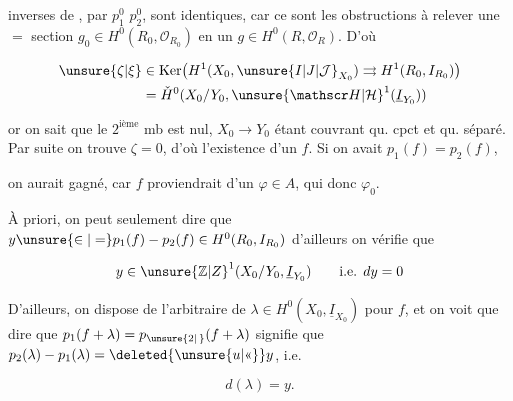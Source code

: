 
inverses de  , par $p_1^0$  $p_2^0$, sont identiques, car ce sont les obstructions à relever une $=$ section $g_0\in H^0(R_0,\mathcal O_{R_0})$ en un $g\in H^0(R,\mathcal O_R)$. D'où

\[
\begin{aligned}
\unsure{\zeta|\xi}&\in\operatorname{Ker}\bigl(H^1(X_0,\unsure{I|J|\mathcal J}_{X_0})\rightrightarrows H^1(R_0,I_{R_0})\bigr)\\
&=\check H^0(X_0/Y_0,{\unsure{\mathscr H|\mathcal H}}^1(\underline I_{Y_0}))
\end{aligned}
\]

or on sait que le $2^{\mathrm{ième}}$ mb est nul, $X_0\longrightarrow Y_0$ étant couvrant qu. cpct et qu. séparé. Par suite on trouve $\zeta=0$, d'où l'existence d'un $f$. Si on avait  $p_1(f)=p_2(f)$,

on aurait gagné, car $f$ proviendrait d'un $\varphi\in A$, qui   donc $\varphi_0$.


À priori, on peut seulement dire que $y\unsure{\in|=}p_1(f)-p_2(f)\in H^0(R_0,I_{R_0})$ d'ailleurs on vérifie que

\[
y\in{\unsure{\mathbb Z|Z}}^{1}(X_0/Y_0,\underline I_{Y_0})\qquad\text{i.e. }dy=0
\]

D'ailleurs, on dispose de l'arbitraire de $\lambda\in H^0(X_0,\underline I_{X_0})$ pour $f$, et on voit que  dire que $p_1(f+\lambda)=p_{\unsure{2|\,}}(f+\lambda)$ signifie que $p_2(\lambda)-p_1(\lambda)=\deleted{\unsure{u|\text{«}}}y$, i.e.

\[
d(\lambda)=y.
\]
